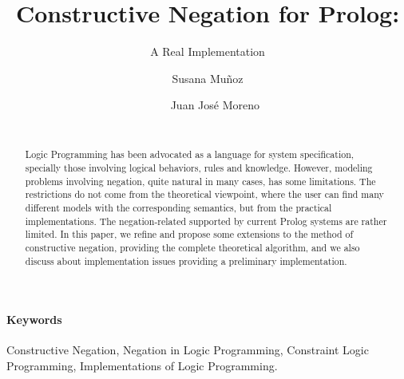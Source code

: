 \documentclass{llncs}
\begin{document}

\title{Constructive Negation for Prolog:}
\subtitle{A Real Implementation}

\author{~~Susana Mu\~{n}oz~~ \and ~~ Juan Jos\'{e} Moreno \\
         ~~~~~~~~~~ }


\maketitle




\begin{abstract}
Logic Programming has been advocated as a language for system specification, specially
those involving logical behaviors, rules and knowledge. However, modeling problems
involving negation, quite natural in many cases, has some limitations. The restrictions
do not come from the theoretical viewpoint, where the user can find many different
models with the corresponding semantics, but from the practical implementations.
The negation-related supported by current Prolog systems are rather limited. 
In this paper, we refine and propose some
extensions to the method of constructive negation, providing the
complete theoretical algorithm, and we also discuss about implementation issues
providing a preliminary implementation.
\end{abstract}

\paragraph{\bf Keywords}
Constructive Negation, Negation in Logic Programming, Constraint Logic
Programming, Implementations of Logic Programming.


\end{document}
